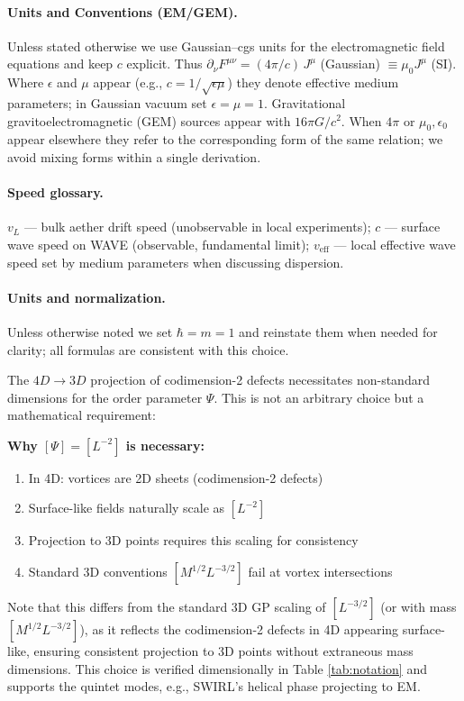 \paragraph{Units and Conventions (EM/GEM).} Unless stated otherwise we use Gaussian--cgs units for the electromagnetic field equations and keep $c$ explicit. Thus $\partial_\nu F^{\mu\nu} = (4\pi/c)\, J^\mu$ (Gaussian) $\equiv \mu_0 J^\mu$ (SI). Where $\epsilon$ and $\mu$ appear (e.g., $c = 1/\sqrt{\epsilon\mu}$) they denote effective medium parameters; in Gaussian vacuum set $\epsilon=\mu=1$. Gravitational gravitoelectromagnetic (GEM) sources appear with $16\pi G/c^2$. When $4\pi$ or $\mu_0,\epsilon_0$ appear elsewhere they refer to the corresponding form of the same relation; we avoid mixing forms within a single derivation.

\paragraph{Speed glossary.} $v_L$ --- bulk aether drift speed (unobservable in local experiments); $c$ --- surface wave speed on WAVE (observable, fundamental limit); $v_{\text{eff}}$ --- local effective wave speed set by medium parameters when discussing dispersion.

\paragraph{Units and normalization.} Unless otherwise noted we set $\hbar=m=1$ and reinstate them when needed for clarity; all formulas are consistent with this choice.


The $4D\to3D$ projection of codimension-2 defects necessitates non-standard dimensions for the order parameter $\Psi$. This is not an arbitrary choice but a mathematical requirement:

\textbf{Why $[\Psi] = [L^{-2}]$ is necessary:}
\begin{enumerate}
\item In 4D: vortices are 2D sheets (codimension-2 defects)
\item Surface-like fields naturally scale as $[L^{-2}]$
\item Projection to 3D points requires this scaling for consistency
\item Standard 3D conventions $[M^{1/2} L^{-3/2}]$ fail at vortex intersections
\end{enumerate}

Note that this differs from the standard 3D GP scaling of $[L^{-3/2}]$ (or with mass $[M^{1/2} L^{-3/2}]$), as it reflects the codimension-2 defects in 4D appearing surface-like, ensuring consistent projection to 3D points without extraneous mass dimensions. This choice is verified dimensionally in Table \ref{tab:notation} and supports the quintet modes, e.g., SWIRL's helical phase projecting to EM.

